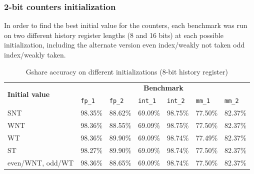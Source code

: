\subsubsection{2-bit counters initialization}
In order to find the best initial value for the counters, each benchmark was run on two different history register lengths (8 and 16 bits) at each possible initialization, including the alternate version even index/weakly not taken odd index/weakly taken.
\begin{table}[hbt]
  \centering
  \begin{tabular}{lllllll}
    \toprule
    \multirow{2}{*}{\textbf{Initial value}} & \multicolumn{6}{c}{\textbf{Benchmark}}                             \\
    \cmidrule{2-7}
                                   & \texttt{fp\_1}               & \texttt{fp\_2}                & \texttt{int\_1}               & \texttt{int\_2}               & \texttt{mm\_1}                & \texttt{mm\_2}                \\
    \midrule
    SNT                            & 98.35\%                      & 88.62\%                       & 69.09\%                       & \cellcolor{cell_blue}98.75\%  & \cellcolor{cell_blue}77.50\%  & 82.37\%                       \\
    WNT                            & 98.36\%                      & 88.55\%                       & 69.09\%                       & 98.75\%                       & 77.50\%                       & \cellcolor{cell_blue}82.37\%  \\
    WT                             & 98.36\%                      & \cellcolor{cell_blue}89.90\%  & \cellcolor{cell_blue}69.09\%  & 98.74\%                       & 77.49\%                       & 82.37\%                       \\
    ST                             & 98.27\%                      & 89.90\%                       & 69.09\%                       & 98.74\%                       & 77.50\%                       & 82.37\%                       \\
    even/WNT, odd/WT               & \cellcolor{cell_blue}98.36\% & 88.65\%                       & 69.09\%                       & 98.74\%                       & 77.50\%                       & 82.37\%                       \\
    \bottomrule
  \end{tabular}
  \caption{Gshare accuracy on different initializations (8-bit history register)}
  \label{tab:init8}
\end{table}
